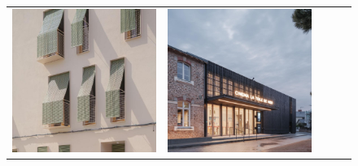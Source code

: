 \begin{figure}[H]
{\begin{tabular}{@{}ccccc@{}}
      \includegraphics[width=\linewidth]{Images/LoRAs/3D-effect/Training_images/11.jpg} &
      \includegraphics[width=\linewidth]{Images/LoRAs/3D-effect/Training_images/12.jpg} &

\end{tabular}}
\end{figure}
